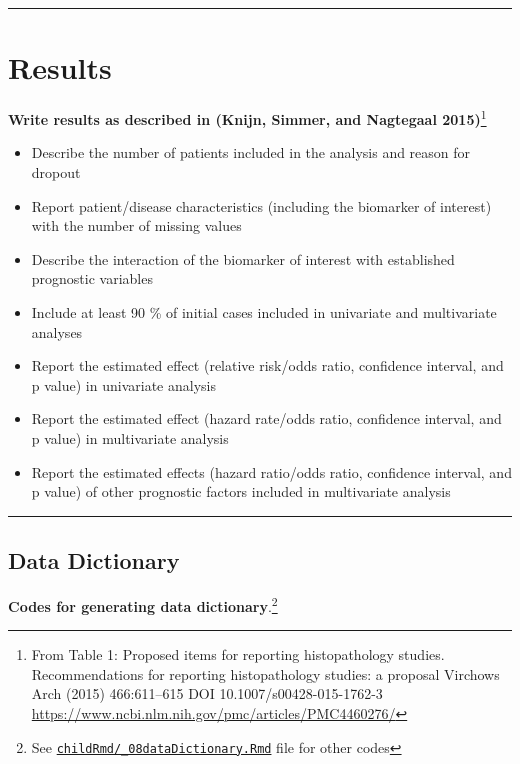\documentclass[
]{article}
\begin{document}
\begin{center}\rule{0.5\linewidth}{0.5pt}\end{center}

\hypertarget{results}{%
\section{Results}\label{results}}

\textbf{Write results as described in (Knijn, Simmer, and Nagtegaal
2015)}\footnote{From Table 1: Proposed items for reporting
  histopathology studies. Recommendations for reporting histopathology
  studies: a proposal Virchows Arch (2015) 466:611--615 DOI
  10.1007/s00428-015-1762-3
  \url{https://www.ncbi.nlm.nih.gov/pmc/articles/PMC4460276/}}

\begin{itemize}
\item
  Describe the number of patients included in the analysis and reason
  for dropout
\item
  Report patient/disease characteristics (including the biomarker of
  interest) with the number of missing values
\item
  Describe the interaction of the biomarker of interest with established
  prognostic variables
\item
  Include at least 90 \% of initial cases included in univariate and
  multivariate analyses
\item
  Report the estimated effect (relative risk/odds ratio, confidence
  interval, and p value) in univariate analysis
\item
  Report the estimated effect (hazard rate/odds ratio, confidence
  interval, and p value) in multivariate analysis
\item
  Report the estimated effects (hazard ratio/odds ratio, confidence
  interval, and p value) of other prognostic factors included in
  multivariate analysis
\end{itemize}

\begin{center}\rule{0.5\linewidth}{0.5pt}\end{center}

\hypertarget{data-dictionary}{%
\subsection{Data Dictionary}\label{data-dictionary}}

\textbf{Codes for generating data dictionary}.\footnote{See
  \href{https://github.com/sbalci/histopathology-template/blob/master/childRmd/_08dataDictionary.Rmd}{\texttt{childRmd/\_08dataDictionary.Rmd}}
  file for other codes}
\end{document}
